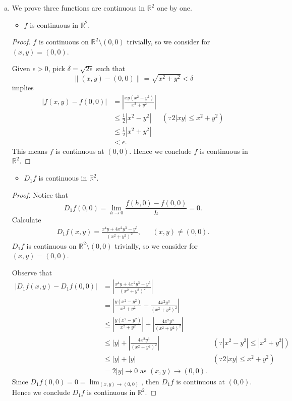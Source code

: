 \begin{Exercise}
	\begin{enumerate}[(a)]
		\item
		We prove three functions are continuous in $\mathbb{R}^2$ one by one.
		\begin{itemize}
			\item $f$ is continuous in $\mathbb{R}^2$.
		\end{itemize}
		\begin{proof}
			$f$ is continuous on $\mathbb{R}^2\setminus (0,0)$ trivially, so we consider for $(x,y) = (0,0)$. 
			
			Given $\epsilon>0$, pick $\delta = \sqrt{2\epsilon}$ such that
			$$
			\| (x,y) - (0,0) \| = \sqrt{x^2+y^2} < \delta
			$$
			implies
			\begin{align*}
			|f(x,y)-f(0,0)|
			&= \left| \frac{xy(x^2-y^2)}{x^2+y^2} \right| \\
			&\leq \frac{1}{2}|x^2-y^2| & (\because 2|xy| \leq x^2+y^2) \\
			&\leq \frac{1}{2} |x^2+y^2| \\
			&< \epsilon.
			\end{align*}
			This means $f$ is continuous at $(0,0)$.
			Hence we conclude $f$ is continuous in $\mathbb{R}^2$.
		\end{proof}
		
		\begin{itemize}
			\item $D_1 f$ is continuous in $\mathbb{R}^2$. 
		\end{itemize}
		\begin{proof}
			Notice that 
			$$
			D_1 f(0,0)
			= \lim_{h\to 0} \frac{f(h,0)-f(0,0)}{h}
			= 0.
			$$
			Calculate
			\begin{align*}
			D_1 f(x,y) = \frac{x^4 y + 4x^2 y^3 - y^5}{(x^2+y^2)^2}, && (x,y)\neq(0,0).
			\end{align*}
			$D_1 f$ is continuous on $\mathbb{R}^2\setminus (0,0)$ trivially, so we consider for $(x,y) = (0,0)$.
			
			Observe that
			\begin{align*}
			|D_1 f(x,y)-D_1 f(0,0)|
			&= \left| \frac{x^4 y + 4x^2 y^3 - y^5}{(x^2+y^2)^2} \right| \\
			&= \left| \frac{y(x^2-y^2)}{x^2+y^2} + \frac{4x^2y^3}{(x^2+y^2)^2} \right| \\
			&\leq \left| \frac{y(x^2-y^2)}{x^2+y^2} \right| + \left| \frac{4x^2y^3}{(x^2+y^2)^2} \right| \\
			&\leq |y| + \left| \frac{4x^2y^3}{(x^2+y^2)^2} \right| & (\because |x^2-y^2| \leq |x^2+y^2|) \\
			&\leq |y| + |y| & (\because 2|xy|\leq x^2+y^2) \\
			&= 2|y| \to 0 \text{ as } (x,y) \to (0,0).
			\end{align*}
			Since $D_1 f(0,0) = 0 = \lim_{(x,y)\to(0,0)}$, then $D_1 f$ is continuous at $(0,0)$.
			Hence we conclude $D_1 f$ is continuous in $\mathbb{R}^2$.
		\end{proof}
		

\end{enumerate}
\end{Exercise}
